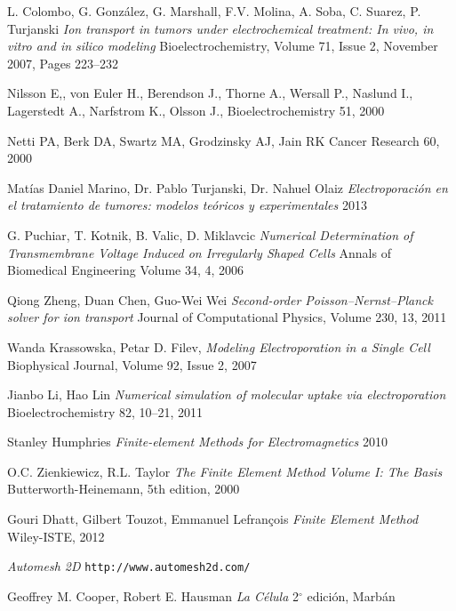 \backmatter


\begin{thebibliography}{99}


	L. Colombo, G. González, G. Marshall, F.V. Molina, A. Soba, C. Suarez, P. Turjanski
	\emph{Ion transport in tumors under electrochemical treatment: In vivo, in vitro and in silico modeling}
    Bioelectrochemistry, Volume 71, Issue 2, November 2007, Pages 223–232

	Nilsson E,, von Euler H., Berendson J., Thorne A., Wersall P., Naslund I., Lagerstedt A., Narfstrom K., Olsson J.,
	Bioelectrochemistry 51,
	2000

	Netti PA, Berk DA, Swartz MA, Grodzinsky AJ, Jain RK
	Cancer Research 60,
	2000

	Matías Daniel Marino, Dr. Pablo Turjanski, Dr. Nahuel Olaiz
	\emph{Electroporación en el tratamiento de tumores: modelos teóricos y experimentales}
	2013

	G. Puchiar, T. Kotnik, B. Valic, D. Miklavcic
	\emph{Numerical Determination of Transmembrane Voltage Induced on Irregularly Shaped Cells}
	Annals of Biomedical Engineering
	Volume 34, 4, 2006

	Qiong Zheng, Duan Chen, Guo-Wei Wei
	\emph{Second-order Poisson–Nernst–Planck solver for ion transport}
	Journal of Computational Physics,	
	Volume 230, 13, 2011

	Wanda Krassowska, Petar D. Filev,
	\emph{Modeling Electroporation in a Single Cell}
	Biophysical Journal, Volume 92, Issue 2, 2007

	Jianbo Li, Hao Lin
	\emph{Numerical simulation of molecular uptake via electroporation}
	Bioelectrochemistry 82, 10–21, 2011 

	Stanley Humphries
	\emph{Finite-element Methods for Electromagnetics}
	2010

	O.C. Zienkiewicz, R.L. Taylor
	\emph{The Finite Element Method Volume I: The Basis}
	Butterworth-Heinemann, 5th edition, 2000
	
    Gouri Dhatt, Gilbert Touzot, Emmanuel Lefrançois
    \emph{Finite Element Method}
    Wiley-ISTE, 2012

	\emph{Automesh 2D}
	\texttt{http://www.automesh2d.com/}

	Geoffrey M. Cooper, Robert E. Hausman
	\emph{La Célula}
	2$^{\circ}$ edición, 
	Marbán


\end{thebibliography}
